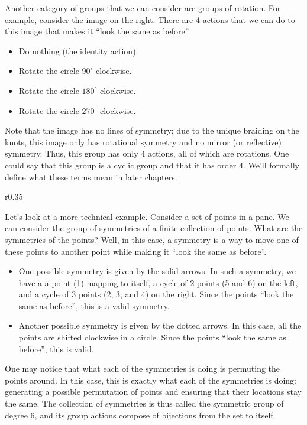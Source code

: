 Another category of groups that we can consider are groups of rotation. For example, consider the image on the right. There are 4 actions that we can do to this image that makes it ``look the same as before''.
\begin{itemize}
    \item Do nothing (the identity action).
    \item Rotate the circle $90^\circ$ clockwise.
    \item Rotate the circle $180^\circ$ clockwise.
    \item Rotate the circle $270^\circ$ clockwise.
\end{itemize}
Note that the image has no lines of symmetry; due to the unique braiding on the knots, this image only has rotational symmetry and no mirror (or reflective) symmetry. Thus, this group has only 4 actions, all of which are rotations. One could say that this group is a cyclic group and that it has order 4. We'll formally define what these terms mean in later chapters.

\begin{wrapfigure}{r}{0.35\textwidth}
    \centering
\end{wrapfigure}

Let's look at a more technical example. Consider a set of points in a pane. We can consider the group of symmetries of a finite collection of points. What are the symmetries of the points? Well, in this case, a symmetry is a way to move one of these points to another point while making it ``look the same as before''.

\begin{itemize}
    \item One possible symmetry is given by the solid arrows. In such a symmetry, we have a a point (1) mapping to itself, a cycle of 2 points (5 and 6) on the left, and a cycle of 3 points (2, 3, and 4) on the right. Since the points ``look the same as before'', this is a valid symmetry.
    \item Another possible symmetry is given by the dotted arrows. In this case, all the points are shifted clockwise in a circle. Since the points ``look the same as before'', this is valid.
\end{itemize}

One may notice that what each of the symmetries is doing is permuting the points around. In this case, this is exactly what each of the symmetries is doing: generating a possible permutation of points and ensuring that their locations stay the same. The collection of symmetries is thus called the symmetric group of degree 6, and its group actions compose of bijections from the set to itself.

